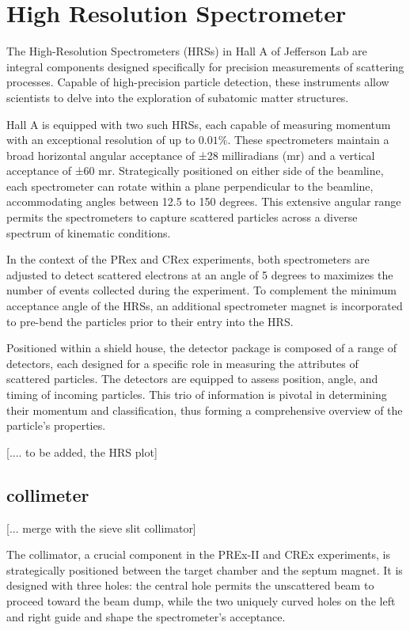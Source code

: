 \section{High Resolution Spectrometer}

The High-Resolution Spectrometers (HRSs) in Hall A of Jefferson Lab are integral components designed specifically for precision measurements of scattering processes. Capable of high-precision particle detection, these instruments allow scientists to delve into the exploration of subatomic matter structures.

Hall A is equipped with two such HRSs, each capable of measuring momentum with an exceptional resolution of up to $0.01\%$. These spectrometers maintain a broad horizontal angular acceptance of ±28 milliradians (mr) and a vertical acceptance of ±60 mr. Strategically positioned on either side of the beamline, each spectrometer can rotate within a plane perpendicular to the beamline, accommodating angles between 12.5 to 150 degrees. This extensive angular range permits the spectrometers to capture scattered particles across a diverse spectrum of kinematic conditions.

In the context of the PRex and CRex experiments, both spectrometers are adjusted to detect scattered electrons at an angle of 5 degrees to maximizes the number of events collected during the experiment. To complement the minimum acceptance angle of the HRSs, an additional spectrometer magnet is incorporated to pre-bend the particles prior to their entry into the HRS.

Positioned within a shield house, the detector package is composed of a range of detectors, each designed for a specific role in measuring the attributes of scattered particles. The detectors are equipped to assess position, angle, and timing of incoming particles. This trio of information is pivotal in determining their momentum and classification, thus forming a comprehensive overview of the particle's properties.

[.... to be added, the HRS plot]

\subsection{collimeter}
[... merge with the sieve slit collimator]

The collimator, a crucial component in the PREx-II and CREx experiments, is strategically positioned between the target chamber and the septum magnet. It is designed with three holes: the central hole permits the unscattered beam to proceed toward the beam dump, while the two uniquely curved holes on the left and right guide and shape the spectrometer's acceptance.

